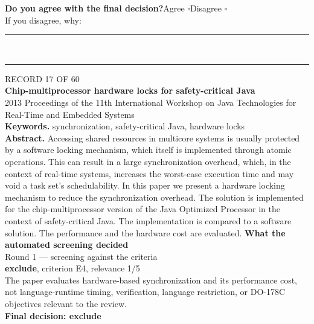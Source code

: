 \documentclass[11pt,a4paper]{article}
\begin{document}
\vspace{2mm}
{\small\textbf{Do you agree with the final decision?}\quad{}Agree $\square$\qquad{}Disagree $\square$}\\[1mm]
{\footnotesize\color{soft}If you disagree, why:}\\[1mm]
\color{rule}\rule{\linewidth}{0.3pt}\\[3mm]\rule{\linewidth}{0.3pt}\color{black}
\clearpage
{\color{soft}\footnotesize RECORD 17 OF 60}\\[1mm]
{\large\bfseries Chip-multiprocessor hardware locks for safety-critical Java}\\[1.5mm]
{\color{soft}\small 2013 \textperiodcentered{} Proceedings of the 11th International Workshop on Java Technologies for Real-Time and Embedded Systems}\\[2mm]
{\small\textbf{Keywords.} synchronization, safety-critical Java, hardware locks}\\[2mm]
{\small\textbf{Abstract.} Accessing shared resources in multicore systems is usually protected by a software locking mechanism, which itself is implemented through atomic operations. This can result in a large synchronization overhead, which, in the context of real-time systems, increases the worst-case execution time and may void a task set's schedulability. In this paper we present a hardware locking mechanism to reduce the synchronization overhead. The solution is implemented for the chip-multiprocessor version of the Java Optimized Processor in the context of safety-critical Java. The implementation is compared to a software solution. The performance and the hardware cost are evaluated.}
\vspace{3mm}
\vspace{2.5mm}
{\small\textbf{What the automated screening decided}}\\[2mm]
{\footnotesize\color{soft}Round 1 --- screening against the criteria}\\[0.5mm]
{\small\textbf{exclude}, criterion E4, relevance 1/5}\\[0.5mm]
{\small The paper evaluates hardware-based synchronization and its performance cost, not language-runtime timing, verification, language restriction, or DO-178C objectives relevant to the review.}\\[2.5mm]
{\small\textbf{Final decision: exclude}}
\vspace{2mm}
\end{document}
